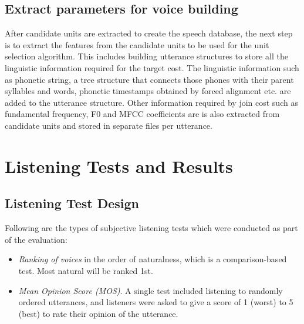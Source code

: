 \documentclass[lettersize,journal]{IEEEtran}
\begin{document}
\subsection{Extract parameters for voice building}
\label{section:extracting_f0}

After candidate units are extracted to create the speech database, the next step is to extract the features from the candidate units to be used for the unit selection algorithm. This includes building utterance structures to store all the linguistic information required for the target cost. The linguistic information such as phonetic string, a tree structure that connects those phones with their parent syllables and words, phonetic timestamps obtained by forced alignment etc. are added to the utterance structure.  Other information required by join cost such as fundamental frequency, F0 and MFCC coefficients are is also extracted from candidate units and stored in separate files per utterance.



\section{Listening Tests and Results}
\label{section:listening_tests}
\subsection{Listening Test Design}
Following are the types of subjective listening tests which were conducted as part of the evaluation:
\begin{itemize}
    \item \textit{Ranking of voices} in the order of naturalness, which is a comparison-based test. Most natural will be ranked 1st. 
    \item \textit{Mean Opinion Score (MOS)}. A single test included listening to randomly ordered  
utterances, and listeners were asked to give a score of 1 (worst) to 5 (best) to rate their opinion of the utterance.
\end{itemize}
\end{document}
